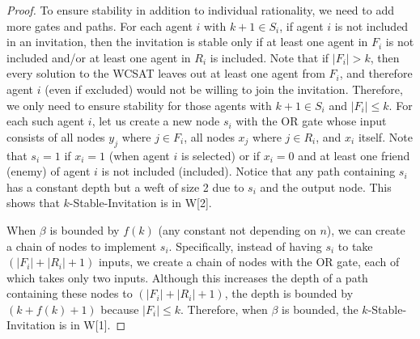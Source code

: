 \begin{proof}
	To ensure stability in addition to individual rationality, we need to add more gates and paths. 	
	For each agent $i$ with $k+1 \in S_i$, if agent $i$ is not included in an invitation, then the invitation is stable only if at least one agent in $F_i$ is not included and/or at least one agent in $R_i$ is included.
	Note that if $|F_i| > k$, then every solution to the WCSAT leaves out at least one agent from $F_i$, and therefore agent $i$ (even if excluded) would not be willing to join the invitation. Therefore, we only need to ensure stability for those agents with $k+1\in S_i$ and $|F_i| \leq k$. 
	For each such agent $i$, let us create a new node $s_i$ with the OR gate whose input consists of all nodes $y_j$ where $j\in F_i$, all nodes $x_j$ where $j \in R_i$, and $x_i$ itself. Note that $s_i = 1$ if $x_i = 1$ (when agent $i$ is selected) or if $x_i = 0$ and at least one friend (enemy) of agent $i$ is not included (included). Notice that any path containing $s_i$ has a constant depth but a weft of size 2 due to $s_i$ and the output node. This shows that $k$-Stable-Invitation is in W[2].
	
	When $\beta$ is bounded by $f(k)$ (any constant not depending on $n$), we can create a chain of nodes to implement $s_i$. Specifically, instead of having $s_i$ to take $(|F_i| + |R_i| + 1)$ inputs, we create a chain of nodes with the OR gate, each of which takes only two inputs. Although this increases the depth of a path containing these nodes to $(|F_i| + |R_i| + 1)$, the depth is bounded by $(k + f(k) + 1)$ because $|F_i| \leq k$. Therefore, when $\beta$ is bounded, the $k$-Stable-Invitation is in W[1].	
\end{proof}

